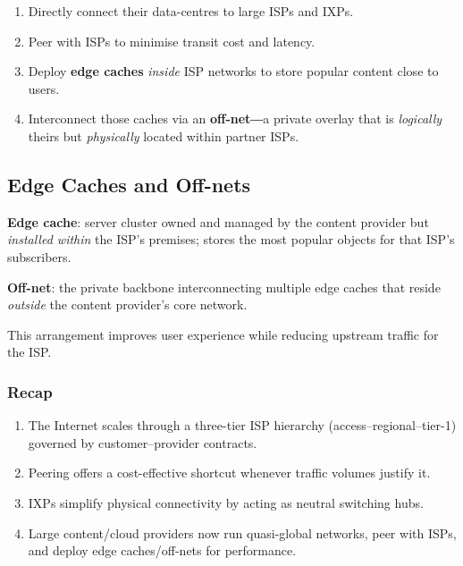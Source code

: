 \documentclass[../../compsys.tex]{subfiles}
\begin{document}
\begin{enumerate}
  \item Directly connect their data-centres to large ISPs and IXPs.
  \item Peer with ISPs to minimise transit cost and latency.
  \item Deploy \textbf{edge caches} \emph{inside} ISP networks to store
        popular content close to users.
  \item Interconnect those caches via an \textbf{off-net}―a private
        overlay that is \emph{logically} theirs but \emph{physically}
        located within partner ISPs.
\end{enumerate}



\subsection{Edge Caches and Off-nets}\label{subsec:edge}
\begin{definition}
  \textbf{Edge cache}: server cluster owned and managed by the content
  provider but \emph{installed within} the ISP's premises; stores the
  most popular objects for that ISP's subscribers.
\end{definition}
\vspace{10px}

\begin{definition}
  \textbf{Off-net}: the private backbone interconnecting multiple edge
  caches that reside \emph{outside} the content provider's core
  network.
\end{definition}

This arrangement improves user experience while reducing upstream
traffic for the ISP.

\subsubsection*{Recap}\label{sssec:recap}
\begin{enumerate}
  \item The Internet scales through a three-tier ISP hierarchy
        (access–regional–tier-1) governed by customer–provider
        contracts.
  \item Peering offers a cost-effective shortcut whenever traffic
        volumes justify it.
  \item IXPs simplify physical connectivity by acting as neutral
        switching hubs.
  \item Large content/cloud providers now run quasi-global networks,
        peer with ISPs, and deploy edge caches/off-nets for performance.
\end{enumerate}
\newpage
\end{document}
